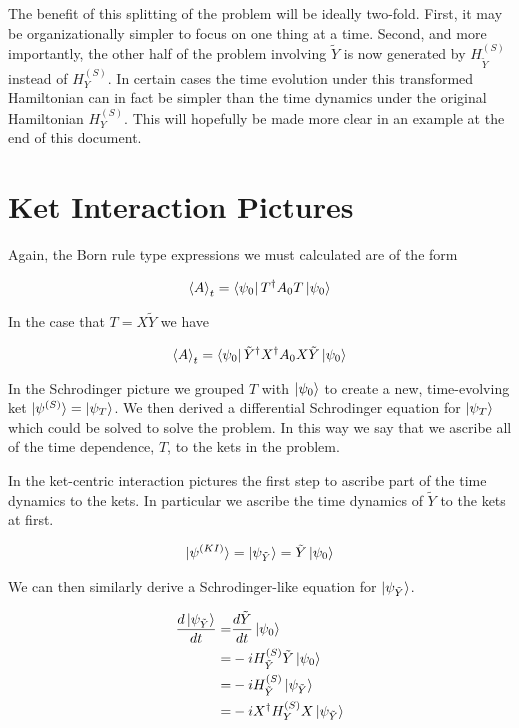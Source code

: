 \documentclass[12pt]{article}
\begin{document}
The benefit of this splitting of the problem will be ideally two-fold.
First, it may be organizationally simpler to focus on one thing at a time.
Second, and more importantly, the other half of the problem involving $\tilde{Y}$ is now generated by $H_{\tilde{Y}}^{(S)}$ instead of $H_Y^{(S)}$.
In certain cases the time evolution under this transformed Hamiltonian can in fact be simpler than the time dynamics under the original Hamiltonian $H_Y^{(S)}$.
This will hopefully be made more clear in an example at the end of this document.

\section{Ket Interaction Pictures}

Again, the Born rule type expressions we must calculated are of the form

\begin{align}
\braket{A}_t = \bra{\psi_0}T^{\dag}A_0T\ket{\psi_0}
\end{align}

In the case that $T = X\tilde{Y}$ we have

\begin{align}
\braket{A}_t = \bra{\psi_0}\tilde{Y}^{\dag}X^{\dag}A_0X\tilde{Y}\ket{\psi_0}
\end{align}

In the Schrodinger picture we grouped $T$ with $\ket{\psi_0}$ to create a new, time-evolving ket $\ket{\psi^{(S)}} = \ket{\psi_T}$.
We then derived a differential Schrodinger equation for $\ket{\psi_T}$ which could be solved to solve the problem.
In this way we say that we ascribe all of the time dependence, $T$, to the kets in the problem.

In the ket-centric interaction pictures the first step to ascribe part of the time dynamics to the kets.
In particular we ascribe the time dynamics of $\tilde{Y}$ to the kets at first.

\begin{align}
\ket{\psi^{(KI)}} = \ket{\psi_{\tilde{Y}}} = \tilde{Y}\ket{\psi_0}
\end{align}

We can then similarly derive a Schrodinger-like equation for $\ket{\psi_{\tilde{Y}}}$.

\begin{align}
\frac{d\ket{\psi_{\tilde{Y}}}}{dt} =& \frac{d\tilde{Y}}{dt} \ket{\psi_0} \nonumber\\
=& -iH_{\tilde{Y}}^{(S)} \tilde{Y}\ket{\psi_0} \nonumber\\
=& -iH_{\tilde{Y}}^{(S)} \ket{\psi_{\tilde{Y}}}\\
=& -iX^{\dag}H_Y^{(S)}X\ket{\psi_{\tilde{Y}}}
\end{align}
\end{document}
